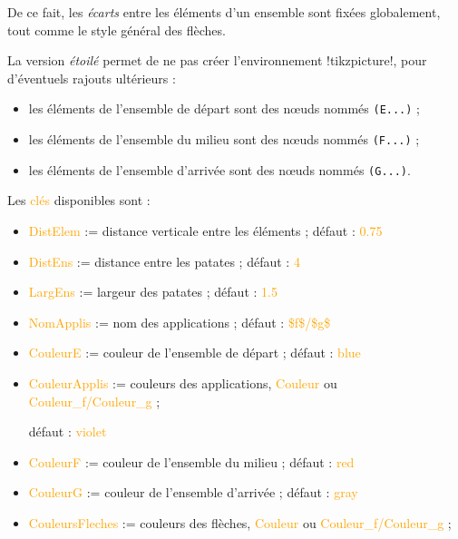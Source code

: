 \documentclass[french,a4paper,11pt]{article}
\newcommand\Cle[1]{{\small\sffamily\textlangle \textcolor{orange}{#1}\textrangle}}
\begin{document}
{{\begin{noteblock}
De ce fait, les \textit{écarts} entre les éléments d'un ensemble sont fixées globalement, tout comme le style général des flèches.
\end{noteblock}

\begin{tipblock}
La version \textit{étoilé} permet de ne pas créer l'environnement \motcletex!tikzpicture!, pour d'éventuels rajouts ultérieurs :

\begin{itemize}
	\item les éléments de l'ensemble de départ sont des nœuds nommés \verb!(E...)! ;
	\item les éléments de l'ensemble du milieu sont des nœuds nommés \verb!(F...)! ;
	\item les éléments de l'ensemble d'arrivée sont des nœuds nommés \verb!(G...)!.
\end{itemize}
\vspace*{-\baselineskip}\leavevmode
\end{tipblock}

\begin{tipblock}
Les \Cle{clés} disponibles sont :

\begin{itemize}
	\item \Cle{DistElem} := distance verticale entre les éléments ; \hfill{}défaut : \Cle{0.75}
	\item \Cle{DistEns} := distance entre les \og patates \fg{} ; \hfill{}défaut : \Cle{4}
	\item \Cle{LargEns} := largeur des \og patates \fg{} ; \hfill{}défaut : \Cle{1.5}
	\item \Cle{NomApplis} := nom des applications ; \hfill{}défaut : \Cle{\$f\$/\$g\$}
	\item \Cle{CouleurE} := couleur de l'ensemble de départ ; \hfill{}défaut : \Cle{blue}
	\item \Cle{CouleurApplis} := couleurs des applications, \Cle{Couleur} ou \Cle{Couleur\_f/Couleur\_g} ;
	
	\hfill{}défaut : \Cle{violet}
	\item \Cle{CouleurF} := couleur de l'ensemble du milieu ; \hfill{}défaut : \Cle{red}
	\item \Cle{CouleurG} := couleur de l'ensemble d'arrivée ; \hfill{}défaut : \Cle{gray}
	\item \Cle{CouleursFleches} := couleurs des flèches, \Cle{Couleur} ou \Cle{Couleur\_f/Couleur\_g} ; 
	

\end{itemize}
\end{tipblock}}}
\end{document}
